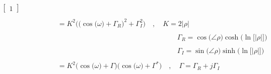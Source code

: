 \documentclass{article}
\begin{document}
\begin{align*}
\begin{bmatrix}
                                                                                                                    1 
                                                                                                                  \end{bmatrix} \\ \\
    & \quad \quad \quad \quad \ \ = K^{2}\Bigg(\bigg(\cos\big(\omega\big) + \Gamma_{R}\bigg)^{2} + \Gamma_{I}^{2}\Bigg) \quad, \quad K = 2\big|\rho\big| \\ \\
    & \quad \quad \quad \quad \quad \quad \quad \quad \quad \quad \quad \quad \quad \quad \quad \quad \quad \quad \quad \quad \quad \ \ \Gamma_{R} = \cos\big(\angle{\rho}\big)\cosh\Big(\ln\Big[\big|\rho\big|\Big]\Big) \\ \\
    & \quad \quad \quad \quad \quad \quad \quad \quad \quad \quad \quad \quad \quad \quad \quad \quad \quad \quad \quad \quad \quad \ \ \Gamma_{I} = \sin\big(\angle{\rho}\big)\sinh\Big(\ln\Big[\big|\rho\big|\Big]\Big) \\ \\
    & \quad \quad \quad \quad \ \ = K^{2}\Big(\cos\big(\omega\big) + \Gamma\Big)\Big(\cos\big(\omega\big) + \Gamma^{*}\Big) \quad , \quad \Gamma = \Gamma_{R} + j\Gamma_{I}
\end{align*}
\end{document}
